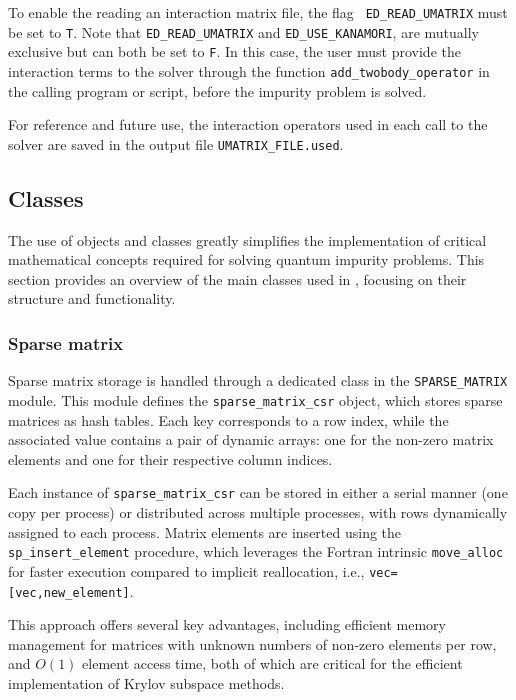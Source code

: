 \documentclass[edipack2.tex]{subfiles}
\begin{document}
To enable the reading an interaction matrix file, the flag {\tt
  ED\_READ\_UMATRIX} must be set to {\tt T}.
Note that {\tt ED\_READ\_UMATRIX} and {\tt ED\_USE\_KANAMORI},
are mutually exclusive but can both be set to {\tt F}. 
In this case, the user must 
provide the interaction terms to the solver through the function 
{\tt add\_twobody\_operator} in the calling program or script, before 
the impurity problem is solved.

For reference and future use, the interaction operators used in each 
call to the solver are saved in the output file 
{\tt UMATRIX\_FILE.used}.

















\subsection{Classes}
The use of objects and classes greatly simplifies the implementation 
of critical mathematical concepts required for solving quantum 
impurity problems. This section provides an overview of the main 
classes used in \NAME, focusing on their structure and functionality.


\subsubsection{Sparse matrix}\label{CodeSparseMatrix}
Sparse matrix storage is handled through a dedicated class in the 
{\tt SPARSE\_MATRIX} module. This module defines the 
{\tt sparse\_matrix\_csr} object, which stores sparse matrices as 
hash tables. Each key corresponds to a row index, while the associated 
value contains a pair of dynamic arrays: one for the non-zero matrix 
elements and one for their respective column indices.

Each instance of {\tt sparse\_matrix\_csr} can be stored in either 
a serial manner (one copy per process) or distributed across multiple 
processes, with rows dynamically assigned to each process. 
Matrix elements are inserted using the 
{\tt sp\_insert\_element} procedure, which leverages the Fortran 
intrinsic {\tt move\_alloc} for faster execution compared to 
implicit reallocation, i.e., {\tt vec=[vec,new\_element]}. 

This approach offers several key advantages, including efficient 
memory management for matrices with unknown numbers of non-zero 
elements per row, and $O(1)$ element access time, both of which 
are critical for the efficient implementation of Krylov subspace 
methods.
\end{document}
